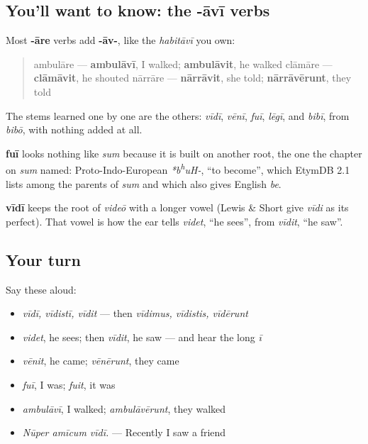 \subsection*{You'll want to know: the -āvī verbs}
Most \textbf{-āre} verbs add \textbf{-āv-}, like the \emph{habitāvī} you own:

\begin{quote}
ambulāre — \textbf{ambulāvī}, I walked; \textbf{ambulāvit}, he walked clāmāre — \textbf{clāmāvit}, he shouted nārrāre — \textbf{nārrāvit}, she told; \textbf{nārrāvērunt}, they told
\end{quote}

The stems learned one by one are the others: \emph{vīdī}, \emph{vēnī}, \emph{fuī}, \emph{lēgī}, and \emph{bibī}, from \emph{bibō}, with nothing added at all.

\begin{cousinweb}
\textbf{fuī} looks nothing like \emph{sum} because it is built on another root, the one the chapter on \emph{sum} named: Proto-Indo-European \emph{*b\textsuperscript{h}uH-}, \textquotedblleft{}to become\textquotedblright{}, which EtymDB 2.1 lists among the parents of \emph{sum} and which also gives English \emph{be}.

\textbf{vīdī} keeps the root of \emph{videō} with a longer vowel (Lewis \& Short give \emph{vīdi} as its perfect). That vowel is how the ear tells \emph{videt}, \textquotedblleft{}he sees\textquotedblright{}, from \emph{vīdit}, \textquotedblleft{}he saw\textquotedblright{}.
\end{cousinweb}

\subsection*{Your turn}
Say these aloud:

\begin{itemize}
\raggedright
  \item \emph{vīdī, vīdistī, vīdit} — then \emph{vīdimus, vīdistis, vīdērunt}
  \item \emph{videt}, he sees; then \emph{vīdit}, he saw — and hear the long \emph{ī}
  \item \emph{vēnit}, he came; \emph{vēnērunt}, they came
  \item \emph{fuī}, I was; \emph{fuit}, it was
  \item \emph{ambulāvī}, I walked; \emph{ambulāvērunt}, they walked
  \item \emph{Nūper amīcum vīdī.} — Recently I saw a friend
\end{itemize}

